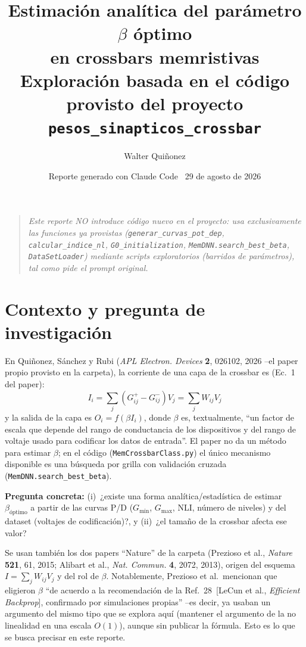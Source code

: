 \documentclass[11pt]{article}
\title{\textbf{Estimación analítica del parámetro $\beta$ óptimo\\ en crossbars memristivas}\\[0.3em]
\large Exploración basada en el código provisto del proyecto \texttt{pesos\_sinapticos\_crossbar}}
\author{Walter Quiñonez}
\date{Reporte generado con Claude Code \textperiodcentered\ 29 de agosto de 2026}
\begin{document}
\maketitle

\begin{quote}\itshape
Este reporte NO introduce código nuevo en el proyecto: usa exclusivamente las
funciones ya provistas (\texttt{generar\_curvas\_pot\_dep}, \texttt{calcular\_indice\_nl},
\texttt{G0\_initialization}, \texttt{MemDNN.search\_best\_beta}, \texttt{DataSetLoader})
mediante scripts exploratorios (barridos de parámetros), tal como pide el prompt original.
\end{quote}

\tableofcontents

\section{Contexto y pregunta de investigación}

En Quiñonez, Sánchez y Rubi (\emph{APL Electron. Devices} \textbf{2}, 026102, 2026 --el
paper propio provisto en la carpeta), la corriente de una capa de la crossbar es
(Ec.~1 del paper):
\[
I_i = \sum_j (G^+_{ij} - G^-_{ij}) V_j = \sum_j W_{ij} V_j
\]
y la salida de la capa es $O_i = f(\beta I_i)$, donde $\beta$ es, textualmente, ``un
factor de escala que depende del rango de conductancia de los dispositivos y del
rango de voltaje usado para codificar los datos de entrada''. El paper no da un
método para estimar $\beta$; en el código (\texttt{MemCrossbarClass.py}) el único
mecanismo disponible es una búsqueda por grilla con validación cruzada
(\texttt{MemDNN.search\_best\_beta}).

\textbf{Pregunta concreta:} (i)~¿existe una forma analítica/estadística de estimar
$\beta_{\text{óptimo}}$ a partir de las curvas P/D ($G_{\min}$, $G_{\max}$, NLI,
número de niveles) y del dataset (voltajes de codificación)?, y (ii)~¿el tamaño de
la crossbar afecta ese valor?

Se usan también los dos papers ``Nature'' de la carpeta (Prezioso et al., \emph{Nature}
\textbf{521}, 61, 2015; Alibart et al., \emph{Nat. Commun.} \textbf{4}, 2072, 2013),
origen del esquema $I=\sum_j W_{ij} V_j$ y del rol de $\beta$. Notablemente, Prezioso
et al.\ mencionan que eligieron $\beta$ ``de acuerdo a la recomendación de la
Ref.~28~[LeCun et al., \emph{Efficient Backprop}], confirmado por simulaciones
propias'' --es decir, ya usaban un argumento del mismo tipo que se explora aquí
(mantener el argumento de la no linealidad en una escala $O(1)$), aunque sin
publicar la fórmula. Esto es lo que se busca precisar en este reporte.
\end{document}

